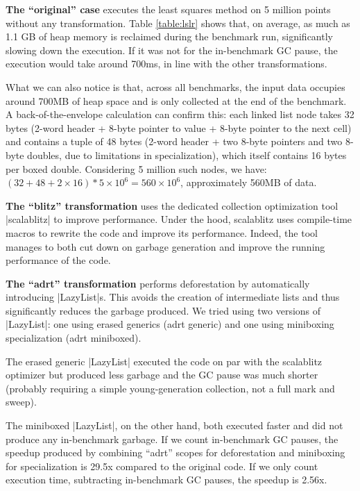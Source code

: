 \noindent
\textbf{The ``original'' case} executes the least squares method on 5 million points without any transformation. Table \ref{table:lslr} shows that, on average, as much as 1.1 GB of heap memory is reclaimed during the benchmark run, significantly slowing down the execution. If it was not for the in-benchmark GC pause, the execution would take around 700ms, in line with the other transformations.

\noindent
What we can also notice is that, across all benchmarks, the input data occupies around 700MB of heap space and is only collected at the end of the benchmark. A back-of-the-envelope calculation can confirm this: each linked list node takes 32 bytes (2-word header + 8-byte pointer to value + 8-byte pointer to the next cell) and contains a tuple of 48 bytes (2-word header + two 8-byte pointers and two 8-byte doubles, due to limitations in specialization), which itself contains 16 bytes per boxed double. Considering 5 million such nodes, we have: $(32 + 48 + 2 \times 16) * 5 \times 10^6 = 560 \times 10^6$, approximately 560MB of data.


\noindent
\textbf{The ``blitz'' transformation} uses the dedicated collection optimization tool |scalablitz| \cite{scalablitz, scalablitz-paper} to improve performance. Under the hood, scalablitz uses compile-time macros to rewrite the code and improve its performance. Indeed, the tool manages to both cut down on garbage generation and improve the running performance of the code.


\noindent
\textbf{The ``adrt'' transformation} performs deforestation by automatically introducing |LazyList|s. This avoids the creation of intermediate lists and thus significantly reduces the garbage produced. We tried using two versions of |LazyList|: one using erased generics (adrt generic) and one using miniboxing \cite{miniboxing} specialization (adrt miniboxed).

The erased generic |LazyList| executed the code on par with the scalablitz optimizer but produced less garbage and the GC pause was much shorter (probably requiring a simple young-generation collection, not a full mark and sweep).

The miniboxed |LazyList|, on the other hand, both executed faster and did not produce any in-benchmark garbage. If we count in-benchmark GC pauses, the speedup produced by combining ``adrt'' scopes for deforestation and miniboxing for specialization is 29.5x compared to the original code. If we only count execution time, subtracting in-benchmark GC pauses, the speedup is 2.56x.


